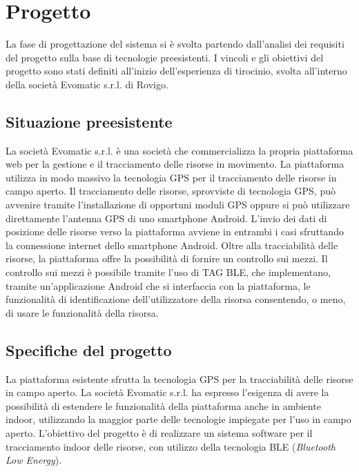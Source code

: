 
\chapter{Progetto}
\label{cap:progetto}

La fase di progettazione del sistema si è svolta partendo dall'analisi dei requisiti del progetto sulla base di tecnologie preesistenti. I vincoli e gli obiettivi del progetto sono stati definiti all’inizio dell’esperienza di tirocinio, svolta all'interno della società Evomatic s.r.l. di Rovigo.

\section{Situazione preesistente}
La società Evomatic s.r.l. è una società che commercializza la propria piattaforma web per la gestione e il tracciamento delle risorse in movimento. La piattaforma utilizza in modo massivo la tecnologia GPS per il tracciamento delle risorse in campo aperto. Il tracciamento delle risorse, sprovviste di tecnologia GPS, può avvenire tramite l'installazione di opportuni moduli GPS oppure si può utilizzare direttamente l'antenna GPS di uno smartphone Android.
L'invio dei dati di posizione delle risorse verso la piattaforma avviene in entrambi i casi sfruttando la connessione internet dello smartphone Android. Oltre alla tracciabilità delle risorse, la piattaforma offre la possibilità di fornire un controllo sui mezzi. Il controllo sui mezzi è possibile tramite l’uso di TAG BLE, che implementano, tramite un'applicazione Android che si interfaccia con la piattaforma, le funzionalità di identificazione dell'utilizzatore della risorsa consentendo, o meno, di usare le funzionalità della risorsa.

\section{Specifiche del progetto}
La piattaforma esistente sfrutta la tecnologia GPS per la tracciabilità delle risorse in campo aperto. La società Evomatic s.r.l. ha espresso l'esigenza di avere la possibilità di estendere le funzionalità della piattaforma anche in ambiente indoor, utilizzando la maggior parte delle tecnologie impiegate per l'uso in campo aperto.
L'obiettivo del progetto è di realizzare un sistema software per il tracciamento indoor delle risorse, con utilizzo della tecnologia BLE (\emph{Bluetooth Low Energy}).

